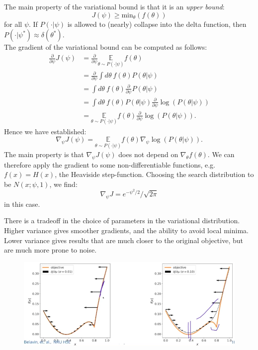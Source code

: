 The main property of the variational bound is that it is an \textit{upper bound}:
\begin{equation*}
J(\psi) \geq \textrm{min}_{\theta}(f(\theta))
\end{equation*}
for all $\psi$. If $P(\cdot | \psi)$ is allowed to (nearly) collapse into the delta function, then $P(\cdot | \psi^*) \approx \delta(\theta^*)$.\\

The gradient of the variational bound can be computed as follows:
\begin{align*}
\frac{\partial}{\partial \psi} J(\psi) &= \frac{\partial}{\partial \psi} \underset{\theta \sim P(\cdot | \psi)}{\mathbb{E}} f(\theta)\\[1.5ex]
&= \frac{\partial}{\partial \psi} \int d\theta\ f(\theta) P(\theta | \psi)\\[1.5ex]
&= \int d\theta\ f(\theta) \frac{\partial}{\partial \psi} P(\theta | \psi)\\[1.5ex]
&= \int d\theta\ f(\theta) P(\theta | \psi) \frac{\partial}{\partial \psi} \log(P(\theta | \psi))\\[1.5ex]
&=  \underset{\theta \sim P(\cdot | \psi)}{\mathbb{E}} f(\theta) \frac{\partial}{\partial \psi} \log(P(\theta | \psi)).
\end{align*}
Hence we have established:
\begin{equation*}
\nabla_{\psi} J(\psi) = \underset{\theta \sim P(\cdot | \psi)}{\mathbb{E}} f(\theta) \nabla_{\psi} \log(P(\theta | \psi)).
\end{equation*}
The main property is that $\nabla_{\psi} J(\psi)$ does not depend on $\nabla_{\theta} f(\theta)$. We can therefore apply the gradient to some non-differentiable functions, e.g. $f(x) = H(x)$, the Heaviside step-function. Choosing the search distribution to be $N(x; \psi, 1)$, we find:
\begin{equation*}
\nabla_{\psi} J = e^{-\psi^2/2}/\sqrt{2\pi}
\end{equation*}
in this case.

\minirule

There is a tradeoff in the choice of parameters in the variational distribution. Higher variance gives smoother gradients, and the ability to avoid local minima. Lower variance gives results that are much closer to the original objective, but are much more prone to noise.

\begin{figure}[H]
\centering
\includegraphics[scale=0.4]{variationalboundtradeoff.png}
\end{figure}

